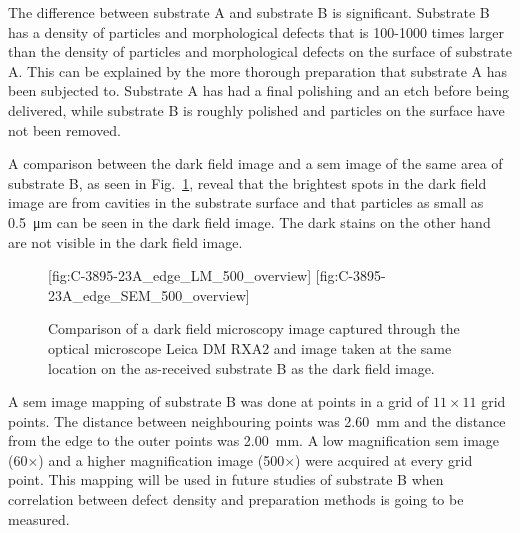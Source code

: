The difference between substrate A and substrate B is significant. Substrate B has a density of particles and morphological defects that is 100-1000 times larger than the density of particles and morphological defects on the surface of substrate A. This can be explained by the more thorough preparation that substrate A has been subjected to. Substrate A has had a final polishing and an etch before being delivered, while substrate B is roughly polished and particles on the surface have not been removed.

A comparison between the dark field image and a \ac{sem} image of the same area of substrate B, as seen in Fig.~\ref{fig:LM_SEM_C3895}, reveal that the brightest spots in the dark field image are from cavities in the substrate surface and that particles as small as \SI{0.5}{\micro\metre} can be seen in the dark field image. The dark stains on the other hand are not visible in the dark field image.

\begin{figure}[htbp]
    \centering
    [fig:C-3895-23A_edge_LM_500_overview]
    \hfill
    [fig:C-3895-23A_edge_SEM_500_overview]
    \caption[Comparison of dark field microscopy and \ac{sem} images.]{Comparison of  a dark field microscopy image captured through the optical microscope Leica DM RXA2 and   image taken at the same location on the as-received substrate B as the dark field image.}
    \label{fig:LM_SEM_C3895}
\end{figure}

A \ac{sem} image mapping of substrate B was done at points in a grid of $11\times11$ grid points. The distance between neighbouring points was \SI{2.60}{\milli\metre} and the distance from the edge to the outer points was \SI{2.00}{\milli\metre}. A low magnification \ac{sem} image (60$\times$) and a higher magnification image (500$\times$) were acquired at every grid point. This mapping will be used in future studies of substrate B when correlation between defect density and preparation methods is going to be measured.

